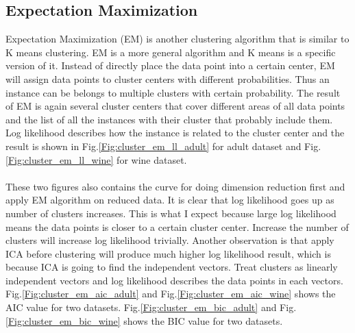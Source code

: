 \documentclass[11pt]{article}
\begin{document}
\subsection{Expectation Maximization}
Expectation Maximization (EM) is another clustering algorithm that is similar to K means clustering. EM is a more general algorithm and K means is a specific version of it. Instead of directly place the data point into a certain center, EM will assign data points to cluster centers with different probabilities. Thus an instance can be belongs to multiple clusters with certain probability. The result of EM is again several cluster centers that cover different areas of all data points and the list of all the instances with their cluster that probably include them. Log likelihood describes how the instance is related to the cluster center and the result is shown in Fig.\ref{Fig:cluster_em_ll_adult} for adult dataset and Fig.\ref{Fig:cluster_em_ll_wine} for wine dataset. \\
\\
These two figures also contains the curve for doing dimension reduction first and apply EM algorithm on reduced data. It is clear that log likelihood goes up as number of clusters increases. This is what I expect because large log likelihood means the data points is closer to a certain cluster center. Increase the number of clusters will increase log likelihood trivially. Another observation is that apply ICA before clustering will produce much higher log likelihood result, which is because ICA is going to find the independent vectors. Treat clusters as linearly independent vectors and log likelihood describes the data points in each vectors.  Fig.\ref{Fig:cluster_em_aic_adult} and Fig.\ref{Fig:cluster_em_aic_wine} shows the AIC value for two datasets. Fig.\ref{Fig:cluster_em_bic_adult} and Fig.\ref{Fig:cluster_em_bic_wine} shows the BIC value for two datasets.
\end{document}
